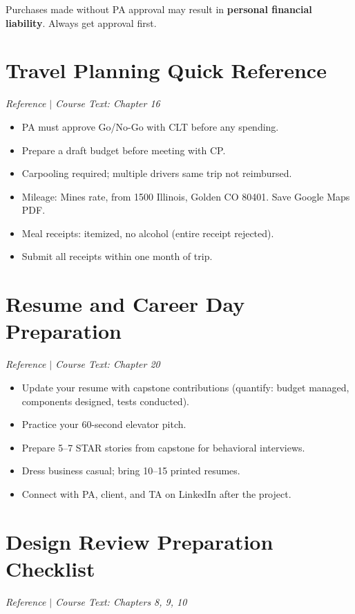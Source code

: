 \documentclass[11pt,letterpaper]{article}
\begin{document}
\begin{warnbox}
Purchases made without PA approval may result in \textbf{personal financial liability}. Always get approval first.
\end{warnbox}


\section{Travel Planning Quick Reference}
\textit{Reference $|$ Course Text: Chapter 16}

\begin{itemize}[nosep,leftmargin=1.5em]
\item PA must approve Go/No-Go with CLT before any spending.
\item Prepare a draft budget before meeting with CP.
\item Carpooling required; multiple drivers same trip not reimbursed.
\item Mileage: Mines rate, from 1500 Illinois, Golden CO 80401. Save Google Maps PDF.
\item Meal receipts: itemized, no alcohol (entire receipt rejected).
\item Submit all receipts within one month of trip.
\end{itemize}


\section{Resume and Career Day Preparation}
\textit{Reference $|$ Course Text: Chapter 20}

\begin{itemize}[nosep,leftmargin=1.5em]
\item Update your resume with capstone contributions (quantify: budget managed, components designed, tests conducted).
\item Practice your 60-second elevator pitch.
\item Prepare 5--7 STAR stories from capstone for behavioral interviews.
\item Dress business casual; bring 10--15 printed resumes.
\item Connect with PA, client, and TA on LinkedIn after the project.
\end{itemize}


\section{Design Review Preparation Checklist}
\textit{Reference $|$ Course Text: Chapters 8, 9, 10}
\end{document}
